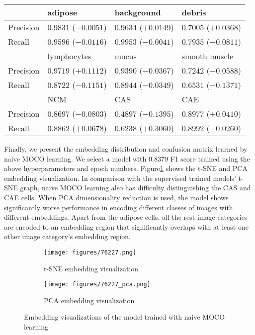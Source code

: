 \documentclass[12pt,twoside]{report}
\begin{document}
\begin{table}[]
    \centering
    \begin{tabular}{llll}
\toprule
 & adipose & background & debris \\
\hline
Precision & $0.9831$ ($-0.0051$) & $0.9634$ ($+0.0149$) & $0.7005$ ($+0.0368$) \\
Recall & $0.9596$ ($-0.0116$) & $0.9953$ ($-0.0041$) & $0.7935$ ($-0.0811$) \\
\toprule
 & lymphocytes & mucus & smooth muscle \\
\hline
Precision & $0.9719$ ($+0.1112$) & $0.9390$ ($-0.0367$) & $0.7242$ ($-0.0588$) \\
Recall & $0.8722$ ($-0.1151$) & $0.8944$ ($-0.0349$) & $0.6531$ ($-0.1371$) \\
\toprule
 & NCM & CAS & CAE \\
\hline
Precision & $0.8697$ ($-0.0803$) & $0.4897$ ($-0.1395$) & $0.8977$ ($+0.0410$) \\
Recall & $0.8862$ ($+0.0678$) & $0.6238$ ($+0.3060$) & $0.8992$ ($-0.0260$) \\
    \bottomrule
    \end{tabular}
    \captionsetup{type=table}
    \label{tab:naiveMOCO_preci_recall}
\end{table}

Finally, we present the embedding distribution and confusion matrix learned by naive MOCO learning. We select a model with 0.8379 F1 score trained using the above hyperparameters and epoch numbers. Figure\ref{fig:moco_embedding} shows the t-SNE and PCA embedding visualization. In comparison with the supervised trained models' t-SNE graph, naive MOCO learning also has difficulty distinguishing the CAS and CAE cells. When PCA dimensionality reduction is used, the model shows significantly worse performance in encoding different classes of images with different embeddings. Apart from the adipose cells, all the rest image categories are encoded to an embedding region that significantly overlaps with at least one other image category's embedding region. \\

\begin{figure}
\centering
    \begin{subfigure}{.45\textwidth}
      \centering
      \texttt{[image: figures/76227.png]}
      \caption{t-SNE embedding visualization}
    \end{subfigure}%
    \begin{subfigure}{.45\textwidth}
      \centering
      \texttt{[image: figures/76227\_pca.png]}
      \caption{PCA embedding visualization}
    \end{subfigure}
    \caption{Embedding visualizations of the model trained with naive MOCO learning}
    \label{fig:moco_embedding}
\end{figure}
\end{document}

